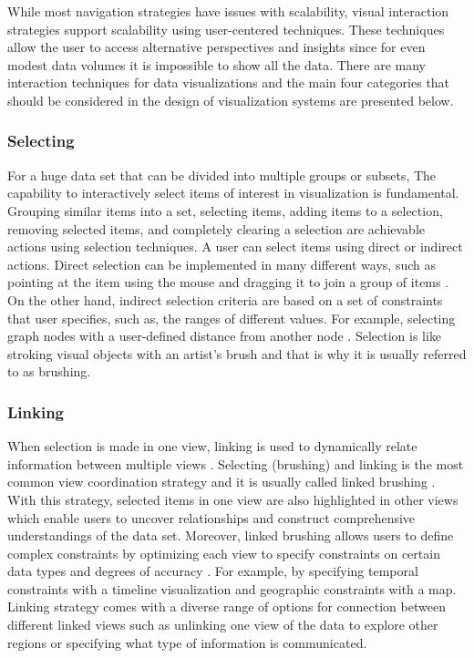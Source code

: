 While most navigation strategies have issues with scalability, visual interaction strategies support scalability using user-centered techniques. These techniques allow the user to access alternative perspectives and insights since for even modest data volumes it is impossible to show all the data. There are many interaction techniques for data visualizations \cite{ward2015interactive} and the main four categories that should be considered in the design of visualization systems are presented below.

\subsubsection{Selecting}

For a huge data set that can be divided into multiple groups or subsets, The capability to interactively select items of interest in visualization is fundamental. Grouping similar items into a set, selecting items, adding items to a selection, removing selected items, and completely clearing a selection are achievable actions using selection techniques. A user can select items using direct or indirect actions. Direct selection can be implemented in many different ways, such as pointing at the item using the mouse and dragging it to join a group of items \cite{wills1996selection}. On the other hand, indirect selection criteria are based on a set of constraints that user specifies, such as, the ranges of different values. For example, selecting graph nodes with a user-defined distance from another node \cite{ward2015interactive}. Selection is like stroking visual objects with an artist’s brush and that is why it is usually referred to as brushing.


\subsubsection{Linking}

When selection is made in one view, linking is used to dynamically relate information between multiple views \cite{north2001multiple,wang2000guidelines}. Selecting (brushing) and linking is the most common view coordination strategy and it is usually called linked brushing \cite{becker1987brushing}. With this strategy, selected items in one view are also highlighted in other views which enable users to uncover relationships and construct comprehensive understandings of the data set. Moreover, linked brushing allows users to define complex constraints by optimizing each view to specify constraints on certain data types and degrees of accuracy \cite{ward2015interactive}. For example, by specifying temporal constraints with a timeline visualization and geographic constraints with a map. Linking strategy comes with a diverse range of options for connection between different linked views such as unlinking one view of the data to explore other regions or specifying what type of information is communicated. 

